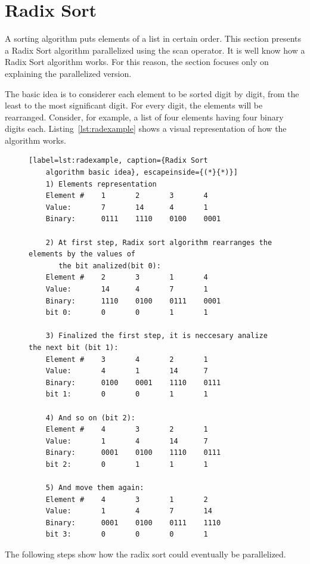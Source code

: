 \documentclass[Ingles]{ic-tese-v1}
\newcommand{\rlst}[1]{Listing~\ref{lst:#1}}
\begin{document}
\section{Radix Sort}
\label{sec:Quicksort}

A sorting algorithm puts elements of a list in certain order. This section
presents a Radix Sort algorithm parallelized using the scan operator. It is
well know how a Radix Sort algorithm works.  For this reason, the section
focuses only on explaining the parallelized version.

The basic idea is to considerer each element to be sorted digit by digit, from
the least to the most significant digit. For every digit, the elements will be rearranged.
Consider, for example, a list of four elements having four binary digits each.
\rlst{radexample} shows a visual representation of how the
algorithm works.

\begin{figure}[t]
	\lstset{basicstyle=\scriptsize}
	\begin{lstlisting}[label=lst:radexample, caption={Radix Sort
	algorithm basic idea}, escapeinside={(*}{*)}]
	1) Elements representation
	Element #    1       2       3       4
	Value:       7       14      4       1
	Binary:      0111    1110    0100    0001

	2) At first step, Radix sort algorithm rearranges the elements by the values of
	   the bit analized(bit 0):
	Element #    2       3       1       4
	Value:       14      4       7       1
	Binary:      1110    0100    0111    0001
	bit 0:       0       0       1       1

	3) Finalized the first step, it is neccesary analize the next bit (bit 1):
	Element #    3       4       2       1
	Value:       4       1       14      7
	Binary:      0100    0001    1110    0111
	bit 1:       0       0       1       1

	4) And so on (bit 2):
	Element #    4       3       2       1
	Value:       1       4       14      7
	Binary:      0001    0100    1110    0111
	bit 2:       0       1       1       1

	5) And move them again:
	Element #    4       3       1       2
	Value:       1       4       7       14
	Binary:      0001    0100    0111    1110
	bit 3:       0       0       0       1

	\end{lstlisting}
\end{figure}

The following steps show how the radix sort could eventually be parallelized.
\end{document}
